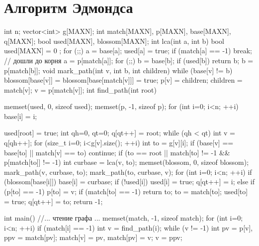 \documentclass[12pt, titlepage]{article}
\begin{document}
\section{Алгоритм Эдмондса}
\begin{cppcode}
int n;
vector<int> g[MAXN];
int match[MAXN], p[MAXN], base[MAXN], q[MAXN];
bool used[MAXN], blossom[MAXN];
int lca(int a, int b) {
    bool used[MAXN] = { 0 };
    for (;;) {
        a = base[a];
        used[a] = true;
        if (match[a] == -1)  break; // дошли до корня
        a = p[match[a]];
    }
    for (;;) {
        b = base[b];
        if (used[b])  return b;
        b = p[match[b]];
    }
}
void mark_path(int v, int b, int children) {
    while (base[v] != b) {
        blossom[base[v]] = blossom[base[match[v]]] = true;
        p[v] = children;
        children = match[v];
        v = p[match[v]];
    }
}
int find_path(int root) {
    memset(used, 0, sizeof used);
    memset(p, -1, sizeof p);
    for (int i=0; i<n; ++i)
        base[i] = i;
 
    used[root] = true;
    int qh=0, qt=0;
    q[qt++] = root;
    while (qh < qt) {
        int v = q[qh++];
        for (size_t i=0; i<g[v].size(); ++i) {
            int to = g[v][i];
            if (base[v] == base[to] || match[v] == to)  continue;
            if (to == root || match[to] != -1 && p[match[to]] != -1) {
                int curbase = lca(v, to);
                memset(blossom, 0, sizeof blossom);
                mark_path(v, curbase, to);
                mark_path(to, curbase, v);
                for (int i=0; i<n; ++i)
                    if (blossom[base[i]]) {
                        base[i] = curbase;
                        if (!used[i]) {
                            used[i] = true;
                            q[qt++] = i;
                        }
                    }
            }
            else if (p[to] == -1) {
                p[to] = v;
                if (match[to] == -1)
                    return to;
                to = match[to];
                used[to] = true;
                q[qt++] = to;
            }
        }
    }
    return -1;
}
int main() {
    //... чтение графа ...
    memset(match, -1, sizeof match);
    for (int i=0; i<n; ++i)
        if (match[i] == -1) {
            int v = find_path(i);
            while (v != -1) {
                int pv = p[v],  ppv = match[pv];
                match[v] = pv,  match[pv] = v;
                v = ppv;
            }
        }
}
\end{cppcode}
\end{document}
